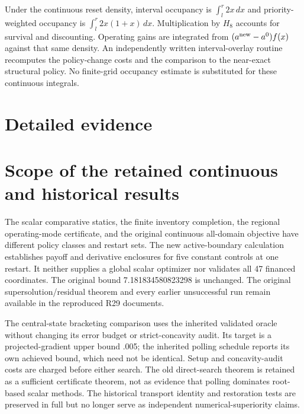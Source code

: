 Under the continuous reset density, interval occupancy is $\int_l^r2x\,dx$ and priority-weighted occupancy is $\int_l^r2x(1+x)\,dx$. Multiplication by $H_8$ accounts for survival and discounting. Operating gains are integrated from $(a^{\rm new}-a^0)f(x)$ against that same density. An independently written interval-overlay routine recomputes the policy-change costs and the comparison to the near-exact structural policy. No finite-grid occupancy estimate is substituted for these continuous integrals.

\section{Detailed evidence}


\section{Scope of the retained continuous and historical results}
The scalar comparative statics, the finite inventory completion, the regional operating-mode certificate, and the original continuous all-domain objective have different policy classes and restart sets. The new active-boundary calculation establishes payoff and derivative enclosures for five constant controls at one restart. It neither supplies a global scalar optimizer nor validates all 47 financed coordinates. The original bound 7.181834580823298 is unchanged. The original supersolution/residual theorem and every earlier unsuccessful run remain available in the reproduced R29 documents.

The central-state bracketing comparison uses the inherited validated oracle without changing its error budget or strict-concavity audit. Its target is a projected-gradient upper bound .005; the inherited polling schedule reports its own achieved bound, which need not be identical. Setup and concavity-audit costs are charged before either search. The old direct-search theorem is retained as a sufficient certificate theorem, not as evidence that polling dominates root-based scalar methods. The historical transport identity and restoration tests are preserved in full but no longer serve as independent numerical-superiority claims.
